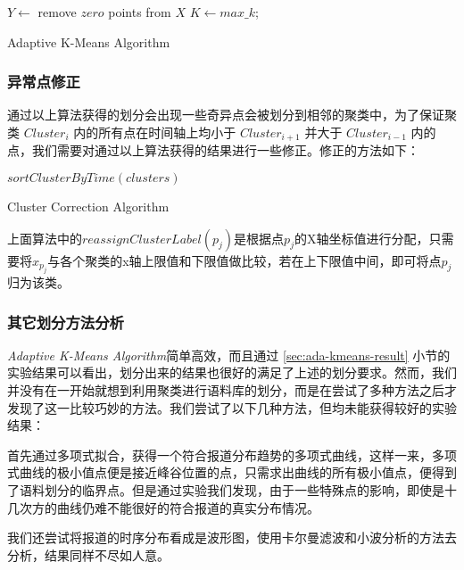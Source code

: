 \begin{algorithm}
  \DontPrintSemicolon
  \BlankLine
  $Y \longleftarrow$ remove $zero$ points from $X$\;
   {$K \leftarrow max\_k$;\;}
  \caption{Adaptive K-Means Algorithm}
  \label{algo:ada-kmeans}
\end{algorithm}

\subsubsection{异常点修正}
通过以上算法获得的划分会出现一些奇异点会被划分到相邻的聚类中，为了保证聚类 $Cluster_i$ 内的所有点在时间轴上均小于 $Cluster_{i+1}$ 并大于 $Cluster_{i-1}$ 内的点，我们需要对通过以上算法获得的结果进行一些修正。修正的方法如下：\par
\begin{algorithm}
  \DontPrintSemicolon
  \BlankLine
  $sortClusterByTime(clusters)$\;
  \caption{Cluster Correction Algorithm}
  \label{algo:cluster_correction}
\end{algorithm}
上面算法中的$reassignClusterLabel(p_j)$是根据点$p_j$的X轴坐标值进行分配，只需要将$x_{p_j}$与各个聚类的x轴上限值和下限值做比较，若在上下限值中间，即可将点$p_j$归为该类。

\subsubsection{其它划分方法分析}
\emph{Adaptive K-Means Algorithm}简单高效，而且通过 \ref{sec:ada-kmeans-result} 小节的实验结果可以看出，划分出来的结果也很好的满足了上述的划分要求。然而，我们并没有在一开始就想到利用聚类进行语料库的划分，而是在尝试了多种方法之后才发现了这一比较巧妙的方法。我们尝试了以下几种方法，但均未能获得较好的实验结果：
\begin{inparaenum}
\item 首先通过多项式拟合，获得一个符合报道分布趋势的多项式曲线，这样一来，多项式曲线的极小值点便是接近峰谷位置的点，只需求出曲线的所有极小值点，便得到了语料划分的临界点。但是通过实验我们发现，由于一些特殊点的影响，即使是十几次方的曲线仍难不能很好的符合报道的真实分布情况。
\item 我们还尝试将报道的时序分布看成是波形图，使用卡尔曼滤波和小波分析的方法去分析，结果同样不尽如人意。
\end{inparaenum}

